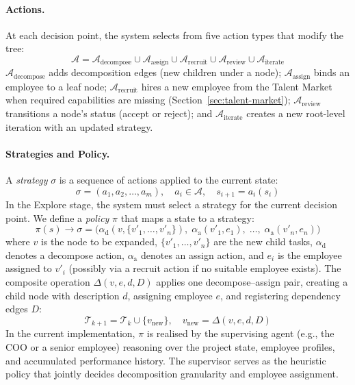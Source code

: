 \documentclass[11pt,a4paper]{article}
\begin{document}
\paragraph{Actions.}
At each decision point, the system selects from five action types that modify the tree:
\begin{equation}
\mathcal{A} = \mathcal{A}_{\text{decompose}} \cup \mathcal{A}_{\text{assign}} \cup \mathcal{A}_{\text{recruit}} \cup \mathcal{A}_{\text{review}} \cup \mathcal{A}_{\text{iterate}}
\end{equation}
$\mathcal{A}_{\text{decompose}}$ adds decomposition edges (new children under a node); $\mathcal{A}_{\text{assign}}$ binds an employee to a leaf node; $\mathcal{A}_{\text{recruit}}$ hires a new employee from the Talent Market when required capabilities are missing (Section~\ref{sec:talent-market}); $\mathcal{A}_{\text{review}}$ transitions a node’s status (accept or reject); and $\mathcal{A}_{\text{iterate}}$ creates a new root-level iteration with an updated strategy.

\paragraph{Strategies and Policy.}
A \emph{strategy} $\sigma$ is a sequence of actions applied to the current state:
\begin{equation}
\sigma = (a_1, a_2, \ldots, a_m), \quad a_i \in \mathcal{A}, \quad s_{i+1} = a_i(s_i)
\end{equation}
In the Explore stage, the system must select a strategy for the current decision point.  We define a \emph{policy} $\pi$ that maps a state to a strategy:
\begin{equation}
\pi(s) \to \sigma = \bigl(\alpha_{\text{d}}(v, \{v'_1, \ldots, v'_n\}),\; \alpha_{\text{a}}(v'_1, e_1),\; \ldots,\; \alpha_{\text{a}}(v'_n, e_n)\bigr)
\end{equation}
where $v$ is the node to be expanded, $\{v'_1, \ldots, v'_n\}$ are the new child tasks, $\alpha_{\text{d}}$ denotes a decompose action, $\alpha_{\text{a}}$ denotes an assign action, and $e_i$ is the employee assigned to $v'_i$ (possibly via a recruit action if no suitable employee exists).  The composite operation $\Delta(v, e, d, D)$ applies one decompose--assign pair, creating a child node with description $d$, assigning employee $e$, and registering dependency edges $D$:
\begin{equation}
\mathcal{T}_{k+1} = \mathcal{T}_k \cup \{v_{\text{new}}\}, \quad v_{\text{new}} = \Delta(v, e, d, D)
\end{equation}
In the current implementation, $\pi$ is realised by the supervising agent (e.g., the COO or a senior employee) reasoning over the project state, employee profiles, and accumulated performance history.  The supervisor serves as the heuristic policy that jointly decides decomposition granularity and employee assignment.
\end{document}
